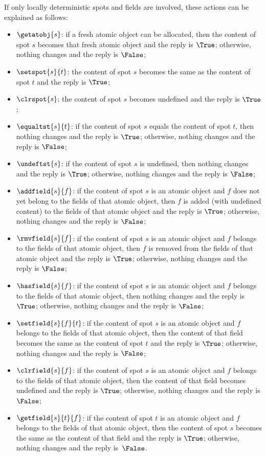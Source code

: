 \documentclass[fleqn]{llncs}
\begin{document}
If only locally deterministic spots and fields are involved, these
actions can be explained as follows:
\begin{itemize}
\item
$\getatobj{s}$:
if a fresh atomic object can be allocated, then the content of spot $s$
becomes that fresh atomic object and the reply is $\True$; otherwise,
nothing changes and the reply is $\False$;
\item
$\setspot{s}{t}$:
the content of spot $s$ becomes the same as the content of spot $t$
and the reply is $\True$;
\item
$\clrspot{s}$:
the content of spot $s$ becomes undefined and the reply is $\True$;
\item
$\equaltst{s}{t}$:
if the content of spot $s$ equals the content of spot $t$, then
nothing changes and the reply is $\True$; otherwise, nothing changes and
the reply is $\False$;
\item
$\undeftst{s}$:
if the content of spot $s$ is undefined, then nothing changes and the
reply is $\True$; otherwise, nothing changes and the reply is $\False$;
\item
$\addfield{s}{f}$:
if the content of spot $s$ is an atomic object and $f$ does not yet
belong to the fields of that atomic object, then $f$ is added (with
undefined content) to the fields of that atomic object and the reply is
$\True$; otherwise, nothing changes and the reply is $\False$;
\item
$\rmvfield{s}{f}$:
if the content of spot $s$ is an atomic object and $f$ belongs to the
fields of that atomic object, then $f$ is removed from the fields of
that atomic object and the reply is $\True$; otherwise, nothing changes
and the reply is $\False$;
\item
$\hasfield{s}{f}$:
if the content of spot $s$ is an atomic object and $f$ belongs to the
fields of that atomic object, then nothing changes and the reply is
$\True$; otherwise, nothing changes and the reply is $\False$;
\item
$\setfield{s}{f}{t}$:
if the content of spot $s$ is an atomic object and $f$ belongs to the
fields of that atomic object, then the content of that field becomes the
same as the content of spot $t$ and the reply is $\True$; otherwise,
nothing changes and the reply is $\False$;
\item
$\clrfield{s}{f}$:
if the content of spot $s$ is an atomic object and $f$ belongs to the
fields of that atomic object, then the content of that field becomes
undefined and the reply is $\True$; otherwise, nothing changes and the
reply is $\False$;
\item
$\getfield{s}{t}{f}$:
if the content of spot $t$ is an atomic object and $f$ belongs to the
fields of that atomic object, then the content of spot $s$ becomes the
same as the content of that field and the reply is $\True$; otherwise,
nothing changes and the reply is~$\False$.
\end{itemize}
\end{document}
